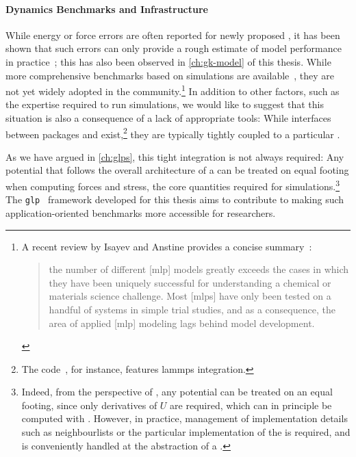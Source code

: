 \paragraph{Dynamics Benchmarks and Infrastructure}
While energy or force errors are often reported for newly proposed \mlps, it has been shown that such errors can only provide a rough estimate of model performance in practice~\cite{fwgj2022a}; this has also been observed in \cref{ch:gk-model} of this thesis.
While more comprehensive benchmarks based on \md simulations are available~\cite{zcwo2020q,fwgj2022a}, they are not yet widely adopted in the \mlp community.\footnote[][-7\baselineskip]{A recent review by Isayev and Anstine provides a concise summary~\cite{ai2023q}:
\begin{quotation}
  \el the number of different [\gls{mlp}] models greatly exceeds the cases in which they have been uniquely successful for understanding a chemical or materials science challenge. Most [\glspl{mlp}] have only been tested on a handful of systems in simple trial studies, and as a consequence, the area of applied [\gls{mlp}] modeling lags behind model development.
\end{quotation}
} In addition to other factors, such as the expertise required to run \md simulations, we would like to suggest that this situation is also a consequence of a lack of appropriate tools: While interfaces between \md packages and \mlps exist,\footnote{The \nequip code~\cite{nequip}, for instance, features \gls{lammps} integration.} they are typically tightly coupled to a particular \mlp.

As we have argued in \cref{ch:glps}, this tight integration is not always required: Any potential that follows the overall architecture of a \glp can be treated on equal footing when computing forces and stress, the core quantities required for \md simulations.\footnote{Indeed, from the perspective of \md, any potential can be treated on an equal footing, since only derivatives of $U$ are required, which can in principle be computed with \ad. However, in practice, management of implementation details such as neighbourlists or the particular implementation of the \mic is required, and is conveniently handled at the abstraction of a \glp.}
The \texttt{glp}~\cite{glp} framework developed for this thesis aims to contribute to making such application-oriented benchmarks more accessible for \ml researchers.


